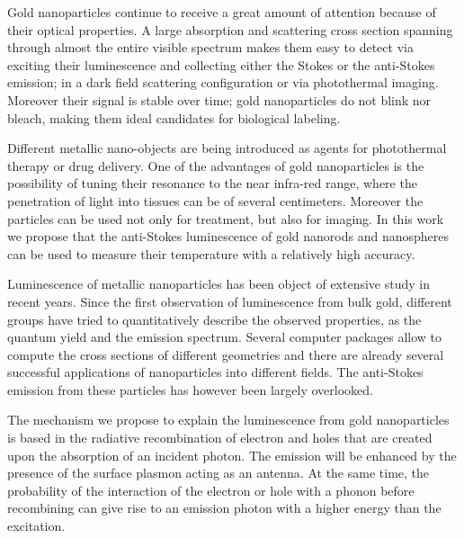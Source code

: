 \documentclass[journal=nalefd,manuscript=letter]{achemso}
\begin{document}
Gold nanoparticles continue to receive a great amount of attention because of
their optical properties\cite{Zijlstra2011}. A large absorption and scattering
cross section spanning through almost the entire visible spectrum makes them
easy to detect via exciting their luminescence and collecting either the Stokes
or the anti-Stokes emission\cite{Jiang2013}; in a dark field
scattering\cite{Hu2008} configuration or via photothermal
imaging\cite{Berciaud2006}. Moreover their signal is stable over time; gold
nanoparticles do not blink nor bleach, making them ideal candidates for
biological labeling.

Different metallic nano-objects are being introduced as agents for photothermal
therapy or drug delivery\cite{Kang2013}. One of the advantages of gold
nanoparticles is the possibility of tuning their resonance to the near infra-red
range, where the penetration of light into tissues can be of several
centimeters\cite{Huang2006,Gobin2007,Hirsch2003,ONeal2004,Li2013c,Huang2008}.
Moreover the particles can be used not only for treatment, but also for imaging.
In this work we propose that the anti-Stokes luminescence of gold nanorods and
nanospheres can be used to measure their temperature with a relatively high
accuracy.

Luminescence of metallic nanoparticles has been object of extensive study in
recent years. Since the first observation of luminescence from bulk
gold\cite{Mooradian1969}, different groups have tried to quantitatively describe
the observed properties\cite{Mohamed2000,Beversluis2003a}, as the quantum
yield\cite{Fang2012,Rao2015,Yorulmaz2012,Cheng2015} and the emission
spectrum\cite{Link2010}. Several computer packages\cite{Yurkin2011} allow to
compute the cross sections of different geometries and there are already several successful
applications of nanoparticles into different fields. The anti-Stokes emission
from these particles has however been largely overlooked.

The mechanism we propose to explain the luminescence from gold nanoparticles is
based in the radiative recombination of electron and holes that are created upon
the absorption of an incident photon\cite{Dulkeith2004,Mooradian1969}. The
emission will be enhanced by the presence of the surface plasmon acting as an
antenna\cite{Mohamed2000}. At the same time, the probability of the interaction
of the electron or hole with a phonon before recombining can give rise to an
emission photon with a higher energy than the
excitation\cite{Hodak2000,Giri2015,Arbouet2003a}.
\end{document}
